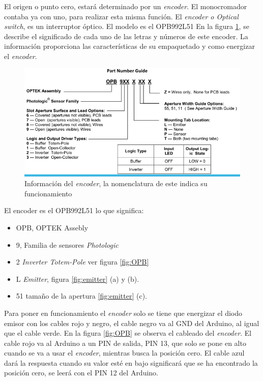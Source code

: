 El origen o punto cero, estará determinado por un \textit{encoder}. El monocromador contaba ya con uno, para realizar esta misma función. El \textit{encoder o Optical switch}, es un interruptor óptico. El modelo es el OPB992L51
En la figura \ref{fig:encoder}, se describe el significado de cada uno de las letras y números de este encoder. La información proporciona las características de su empaquetado y como energizar el \textit{encoder}.
\begin{figure}[h]
	\centering
	\includegraphics[width=0.8\linewidth]{Imagenes/3/Encoder}
	\caption{Información del \textit{encoder}, la nomenclatura de este indica su funcionamiento \cite{OPB992}}
	\label{fig:encoder}
\end{figure}
El encoder es el OPB992L51 lo que significa:
\begin{itemize}
	\item OPB, OPTEK Assebly
	\item 9, Familia de sensores \textit{Photologic}
	\item 2 \textit{Inverter Totem-Pole} ver figura \ref{fig:OPB}
	\item L \textit{Emitter}, figura \ref{fig:emitter} (a) y (b).
	\item 51 tamaño de la apertura \ref{fig:emitter} (c).
\end{itemize}
Para poner en funcionamiento el \textit{encoder} solo se tiene que energizar el diodo emisor con los cables rojo y negro, el cable negro va al GND del Arduino, al igual que el cable verde. En la figura \ref{fig:OPB} se observa el cableado del \textit{encoder}. El cable rojo va al Arduino a un PIN de salida, PIN 13, que solo se pone en alto cuando se va a usar el \textit{encoder}, mientras busca la posición cero. El cable azul dará la respuesta cuando su valor esté en bajo significará que se ha encontrado la posición cero, se leerá con el PIN 12 del Arduino.

